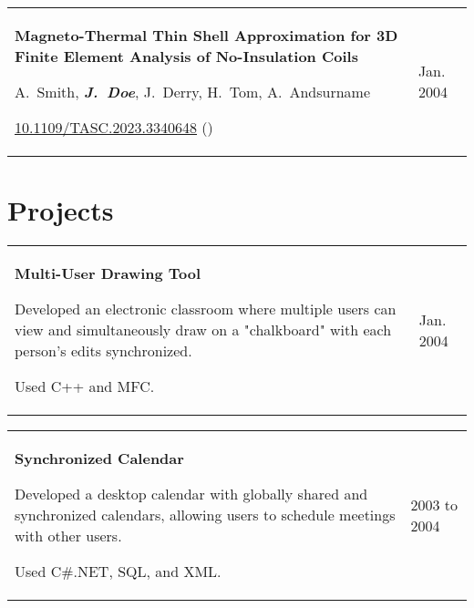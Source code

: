 \begin{tabularx}{ cm-0.13cm}{K{0.2 cm} R{4.1 cm}}
    \textbf{Magneto-Thermal Thin Shell Approximation for 3D Finite Element Analysis of No-Insulation Coils}

    \vspace{0.10 cm}

    \mbox{A. Smith}, \mbox{\textbf{\textit{J. Doe}}}, \mbox{J. Derry}, \mbox{H. Tom}, \mbox{A. Andsurname}

    \vspace{0.10 cm}

    \href{https://doi.org/10.1109/TASC.2023.3340648}{10.1109/TASC.2023.3340648} ()    &
    Jan. 2004
\end{tabularx}

\section{Projects}
\begin{tabularx}{
     cm-0.13cm
}{
    K{0.2 cm}
    R{4.1 cm}
}
    \textbf{Multi-User Drawing Tool}

    \vspace{0.10 cm}

    \begin{highlights}
        \item Developed an electronic classroom where multiple users can view and simultaneously draw on a "chalkboard" with each person's edits synchronized.
        \item Used C++ and MFC.
    \end{highlights}
    &
    

    Jan. 2004
\end{tabularx}


\vspace{0.2 cm}
\begin{tabularx}{
     cm-0.13cm
}{
    K{0.2 cm}
    R{4.1 cm}
}
    \textbf{Synchronized Calendar}

    \vspace{0.10 cm}

    \begin{highlights}
        \item Developed a desktop calendar with globally shared and synchronized calendars, allowing users to schedule meetings with other users.
        \item Used C\#.NET, SQL, and XML.
    \end{highlights}
    &
    

    2003 to 2004
\end{tabularx}


